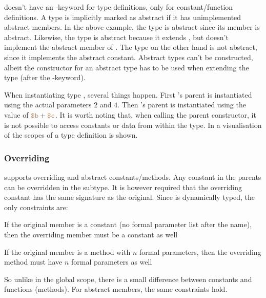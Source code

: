 
\productname{} doesn't have an -keyword for type definitions, only
for constant/function definitions. A type is implicitly marked as abstract if it has
unimplemented abstract members. In the above example, the type  is abstract
since its member  is abstract. Likewise, the type
 is abstract because it extends , but doesn't implement the abstract
member of . The type  on the other hand is not abstract, since it
implements the abstract constant. Abstract types can't be constructed, albeit the
constructor for an abstract type has to be used when extending the type (after the
-keyword).

When instantiating type , several things happen. First 's parent
is instantiated using the actual parameters $2$ and $4$. Then 's parent
is instantiated using the value of $\variable{b} + \variable{c}$. It is worth
noting that, when calling the parent constructor, it is not possible to access
constants or data from within the type. In  a
visualisation of the scopes of a type definition is shown.


\subsubsection{Overriding}

\productname{} supports overriding and abstract constants/methods. Any constant
in the parents can be overridden in the subtype. It is however required that the
overriding constant has the same signature as the original. Since
\productname{} is dynamically typed, the only constraints are:
\begin{nlist}
\item If the original member is a constant (no formal parameter list after the name),
  then the overriding member must be a constant as well
\item If the original member is a method with $n$ formal parameters, then the
  overriding method must have $n$ formal parameters as well
\end{nlist}
So unlike in the global scope, there is a small difference between constants and
functions (methods). For abstract members, the same constraints hold.

